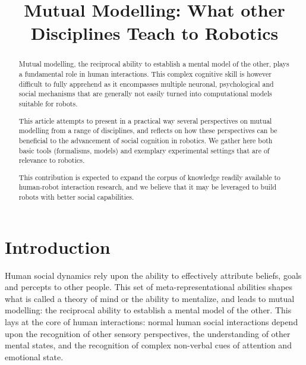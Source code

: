 \documentclass{sig-alternate}
\title{\LARGE \bf
Mutual Modelling: What other Disciplines Teach to Robotics
}
\begin{document}
\maketitle

\begin{abstract}
Mutual modelling, the reciprocal ability to establish a mental model of the
other, plays a fundamental role in human interactions. This complex cognitive
skill is however difficult to fully apprehend as it encompasses multiple
neuronal, psychological and social mechanisms that are generally not easily
turned into computational models suitable for robots.

This article attempts to present in a practical way several perspectives on
mutual modelling from a range of disciplines, and reflects on how these
perspectives can be beneficial to the advancement of social cognition in
robotics. We gather here both basic tools (formalisms, models) and exemplary
experimental settings that are of relevance to robotics.

This contribution is expected to expand the corpus of knowledge readily
available to human-robot interaction research, and we believe that it may be
leveraged to build robots with better social capabilities.

\end{abstract}


\section{Introduction}

Human social dynamics rely upon the ability to effectively attribute beliefs,
goals and percepts to other people. This set of meta-representational abilities
shapes what is called a theory of mind or the ability to mentalize, and leads to
mutual modelling: the reciprocal ability to establish a mental model of the
other. This lays at the core of human interactions: normal human social
interactions depend upon the recognition of other sensory perspectives, the
understanding of other mental states, and the recognition of complex non-verbal
cues of attention and emotional state.
\end{document}
